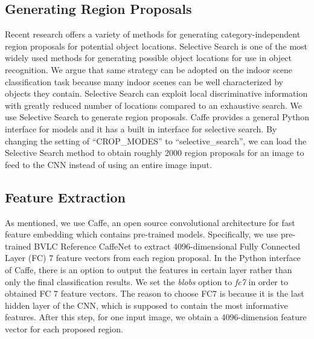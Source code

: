 \subsection{Generating Region Proposals}
Recent research offers a variety of methods for generating category-independent
region proposals for potential object locations. Selective Search is one of the
most widely used methods for generating possible object locations for use in
object recognition\cite{Uijlings:2013:SSO}. We argue that same strategy can be
adopted on the indoor scene classification task because many indoor scenes can
be well characterized by objects they contain. Selective Search can exploit
local discriminative information with greatly reduced number of locations
compared to an exhaustive search. We use Selective Search to generate region
proposals. Caffe provides a general Python interface for models and it has
a built in interface for selective search. By changing the setting of
``CROP\_MODES'' to ``selective\_search'', we can load the Selective Search
method to obtain roughly 2000 region proposals for an image to feed to the
CNN instead of using an entire image input.

\subsection{Feature Extraction}
As mentioned, we use Caffe, an open source convolutional architecture for
fast feature embedding which contains pre-trained models. Specifically, we use
pre-trained BVLC Reference CaffeNet to extract 4096-dimensional Fully Connected
Layer (FC) 7 feature vectors from each region proposal. In the Python interface
of Caffe, there is
an option to output the features in certain layer rather than only the final
classification results. We set the \textit{blobs} option to \textit{fc7} in
order to obtained FC 7 feature vectors. The reason to choose FC7 is because it
is the last hidden layer of the CNN, which is supposed to contain the most
informative features. After this step, for one input image, we obtain
a 4096-dimension feature vector for each proposed region.

